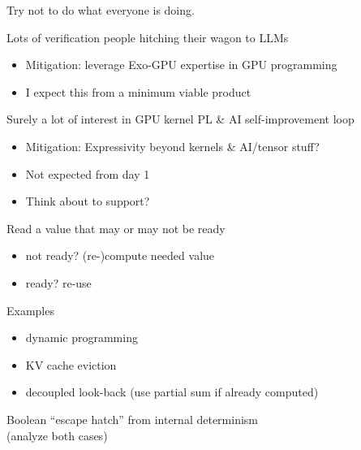 \newpage
{}

{\LARGE
Try not to do what everyone is doing.

\vfill

Lots of verification people hitching their wagon to LLMs
\begin{itemize}
  \item Mitigation: leverage Exo-GPU expertise in GPU programming
  \item I expect this from a minimum viable product
\end{itemize}

\vfill

Surely a lot of interest in GPU kernel PL \& AI self-improvement loop
\begin{itemize}
  \item Mitigation: Expressivity beyond kernels \& AI/tensor stuff?
  \item Not expected from day 1
  \item Think about  to support?
\end{itemize}

\vfill

}

\newpage
{}

{\LARGE

Read a value that may or may not be ready
\begin{itemize}
  \item not ready? (re-)compute needed value
  \item ready? re-use
\end{itemize}

\vfill
Examples
\begin{itemize}
  \item dynamic programming
  \item KV cache eviction
  \item decoupled look-back (use partial sum if already computed)
\end{itemize}

\vfill

Boolean ``escape hatch'' from internal determinism\\
(analyze both cases)

\vfill

}

\newpage
{}

